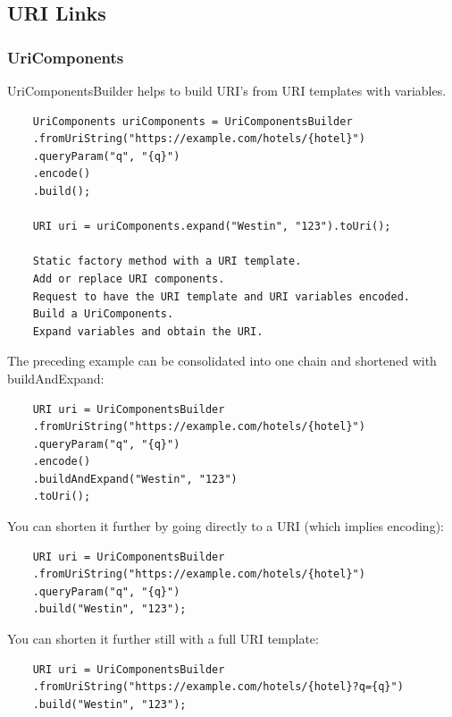 \documentclass{scrartcl}
\begin{document}
\subsection{URI Links}

\subsubsection{UriComponents}

UriComponentsBuilder helps to build URI’s from URI templates with variables.

\begin{lstlisting}
    UriComponents uriComponents = UriComponentsBuilder
    .fromUriString("https://example.com/hotels/{hotel}")
    .queryParam("q", "{q}")
    .encode()
    .build();

    URI uri = uriComponents.expand("Westin", "123").toUri();

    Static factory method with a URI template.
    Add or replace URI components.
    Request to have the URI template and URI variables encoded.
    Build a UriComponents.
    Expand variables and obtain the URI.

\end{lstlisting}

The preceding example can be consolidated into one chain and shortened with buildAndExpand:

\begin{lstlisting}
    URI uri = UriComponentsBuilder
    .fromUriString("https://example.com/hotels/{hotel}")
    .queryParam("q", "{q}")
    .encode()
    .buildAndExpand("Westin", "123")
    .toUri();

\end{lstlisting}

You can shorten it further by going directly to a URI (which implies encoding):

\begin{lstlisting}
    URI uri = UriComponentsBuilder
    .fromUriString("https://example.com/hotels/{hotel}")
    .queryParam("q", "{q}")
    .build("Westin", "123");

\end{lstlisting}

You can shorten it further still with a full URI template:

\begin{lstlisting}
    URI uri = UriComponentsBuilder
    .fromUriString("https://example.com/hotels/{hotel}?q={q}")
    .build("Westin", "123");
\end{lstlisting}
\end{document}
